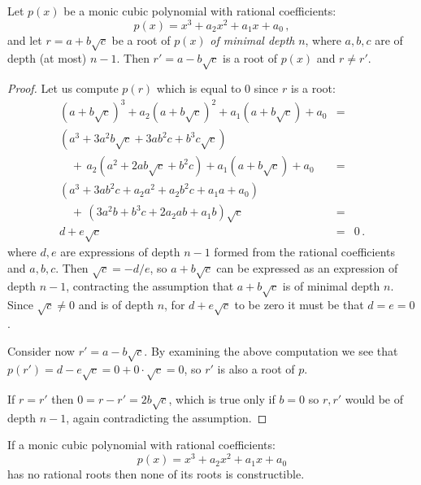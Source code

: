 \begin{theorem}\label{thm.trisect.conjugate}
Let $p(x)$ be a monic cubic polynomial with rational coefficients:
\[
p(x)=x^3+a_2x^2+a_1x+a_0\,,
\]
and let $r=a+b\sqrt{c}$ be a root of $p(x)$ \emph{of minimal depth} $n$, where $a,b,c$ are of depth (at most) $n-1$. Then $r'=a-b\sqrt{c}$ is a root of $p(x)$ and $r\neq r'$.
\end{theorem}

\newpage

\begin{proof} Let us compute $p(r)$ which is equal to $0$ since $r$ is a root:
\[
\renewcommand{\arraystretch}{1.4}
\begin{array}{lcr}
(a+b\sqrt{c})^3+a_2(a+b\sqrt{c})^2+a_1(a+b\sqrt{c})+a_0&=\\
(a^3+3a^2b\sqrt{c}+3ab^2c+b^3c\sqrt{c})\\
\quad+\,a_2(a^2+2ab\sqrt{c}+b^2c) +a_1(a+b\sqrt{c}) +a_0&=\\
(a^3+3ab^2c+a_2a^2+a_2b^2c+a_1a+a_0)\\
\quad+\,(3a^2b+b^3c+2a_2ab+a_1b)\sqrt{c}&=\\
d+e\sqrt{c}&=&0\,.
\end{array}
\]
where $d,e$ are expressions of depth $n-1$ formed from the rational coefficients and $a,b,c$. Then $\sqrt{c}=-d/e$, so $a+b\sqrt{c}$ can be expressed as an expression of depth $n-1$, contracting the assumption that $a+b\sqrt{c}$ is of minimal depth $n$. Since $\sqrt{c}\neq 0$ and is of depth $n$, for $d+e\sqrt{c}$ to be zero it must be that $d=e=0$.

Consider now $r'=a-b\sqrt{c}$. By examining the above computation we see that $p(r')=d-e\sqrt{c}=0+0\cdot\sqrt{c}=0$, so $r'$ is also a root of $p$.

If $r= r'$ then $0=r-r'=2b\sqrt{c}$, which is true only if $b=0$ so $r,r'$ would be of depth $n-1$, again contradicting the assumption.
\end{proof}                                

\begin{theorem}
If a monic cubic polynomial with rational coefficients:
\[p(x)=x^3+a_2x^2+a_1x+a_0\] has no rational roots then none of its roots is constructible.
\end{theorem}

